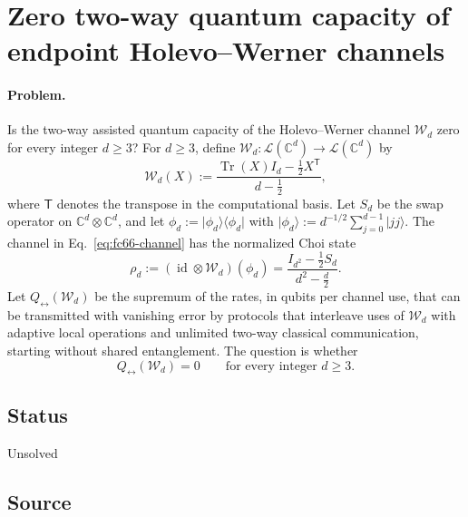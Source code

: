\section{Zero two-way quantum capacity of endpoint Holevo--Werner channels}
\label{sec:op_fc663252f5664f40}

\paragraph{Problem.}
Is the two-way assisted quantum capacity of the Holevo--Werner channel
$\mathcal W_d$ zero for every integer $d\geq3$?  For $d\geq3$, define
$\mathcal W_d:\mathcal L(\mathbb C^d)\to\mathcal L(\mathbb C^d)$ by
\begin{equation}
  \mathcal W_d(X):=\frac{\operatorname{Tr}(X)I_d-\frac12X^{\mathsf T}}{d-\frac12},
  \label{eq:fc66-channel}
\end{equation}
where $\mathsf T$ denotes the transpose in the computational basis.  Let $S_d$
be the swap operator on $\mathbb C^d\otimes\mathbb C^d$, and let
$\phi_d:=\lvert\phi_d\rangle\!\langle\phi_d\rvert$ with
$\lvert\phi_d\rangle:=d^{-1/2}\sum_{j=0}^{d-1}\lvert jj\rangle$.  The channel in
Eq.~\eqref{eq:fc66-channel} has the normalized Choi state
\begin{equation}
  \rho_d:=(\operatorname{id}\otimes\mathcal W_d)(\phi_d)
  =\frac{I_{d^2}-\frac12S_d}{d^2-\frac d2}.
  \label{eq:fc66-choi-state}
\end{equation}
Let $Q_{\leftrightarrow}(\mathcal W_d)$ be the supremum of the rates, in
qubits per channel use, that can be transmitted with vanishing error by
protocols that interleave uses of $\mathcal W_d$ with adaptive local
operations and unlimited two-way classical communication, starting without
shared entanglement.  The question is whether
\begin{equation}
  Q_{\leftrightarrow}(\mathcal W_d)=0
  \qquad\text{for every integer }d\geq3 .
  \label{eq:fc66-question}
\end{equation}

\subsection*{Status}

Unsolved

\subsection*{Source}

